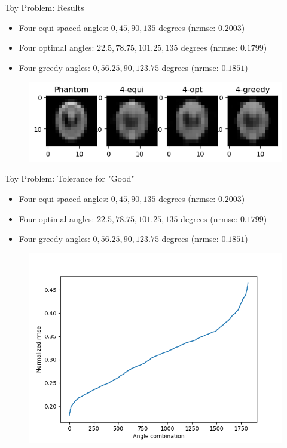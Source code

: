 \documentclass[english,aspectratio=169]{beamer}
\begin{document}
\begin{frame}{Toy Problem: Results}
	\begin{itemize}
	    \item Four equi-spaced angles: $0, 45, 90, 135$ degrees (nrmse: $0.2003$)
	    \item Four optimal angles: $22.5, 78.75, 101.25, 135$ degrees (nrmse: $0.1799$)
	    \item Four greedy angles: $0, 56.25, 90, 123.75$ degrees (nrmse: $0.1851$)
        
	\end{itemize}
	
	\begin{figure}
    \includegraphics[scale=1.0]{Figs/plot_recon_compare2.png}
    \end{figure}
	
\end{frame}

\begin{frame}{Toy Problem: Tolerance for "Good"}
	\begin{itemize}
	    \item Four equi-spaced angles: $0, 45, 90, 135$ degrees (nrmse: $0.2003$)
	    \item Four optimal angles: $22.5, 78.75, 101.25, 135$ degrees (nrmse: $0.1799$)
	    \item Four greedy angles: $0, 56.25, 90, 123.75$ degrees (nrmse: $0.1851$)
	\end{itemize}
	
	\begin{figure}
    \includegraphics[scale=0.45]{Figs/cost_angles_plot.png}
    \end{figure}
	
\end{frame}



\end{document}
